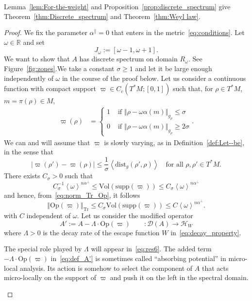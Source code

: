\documentclass[AHL,Unicode,longabstracts,published]{cedram}
\newcommand{\clH}{\mathcal{H}}
\newcommand{\clD}{\mathcal{D}}
\newcommand{\dist}{\mathrm{dist}}
\newcommand{\Voll}{\mathrm{Vol}}
\newcommand{\supp}{\mathrm{supp}}
\newcommand{\Opp}{\mathrm{Op}}
\newcommand{\Tr}{\mathrm{Tr}}
\newcommand{\bbR}{\mathbb{R}}
\newcommand{\clH}{\mathcal{H}}
\newcommand{\bbR}{\mathbb{R}}
\begin{document}
Lemma~\ref{lem:For-the-weight} and Proposition~\ref{prop:discrete_spectrum} give Theorem~\ref{thm:Discrete_spectrum} and Theorem~\ref{thm:Weyl law}.
\begin{proof}
We fix the parameter $\alpha^{\parallel}=0$ that enters in the metric~\eqref{eq:conditions}. Let $\omega\in\bbR$ and set
\begin{equation}\label{eq:def_J_omega}
J_{\omega}:=\left[\omega-1,\omega+1\right].
\end{equation}
We want to show that $A$ has discrete spectrum on domain $R_{\omega}$. See Figure~\ref{fig:zones}.\linebreak We take a constant $\sigma\geq1$ and let it be large enough independently of $\omega$ in the course of the proof below. Let us consider a continuous function with compact support $\varpi\in C_{c}(T^{*}M;[0,1])$ such that, for $\rho\in T^{*}M$, $m=\pi(\rho)\in M$,
\begin{align}\label{eq:def_Omega_0'}
\varpi\left(\rho\right) & =
\begin{cases}
1 & \text{ if }\left\Vert \rho-\omega\alpha\left(m\right)\right\Vert _{g_{\rho}}\leq\sigma\\
0 & \text{ if }\left\Vert \rho-\omega\alpha\left(m\right)\right\Vert _{g_{\rho}}\geq2\sigma
\end{cases}.
\end{align}
We can and will assume that $\varpi$ is slowly varying, as in Definition~\ref{def:Let--be}, in the sense that
\begin{equation}\label{eq:slow_variation_varpi}
\left|\varpi\left(\rho'\right)-\varpi\left(\rho\right)\right|\leq\frac{1}{\sigma}\left\langle \dist_{g}\left(\rho',\rho\right)\right\rangle \quad\text{for all }\rho,\rho'\in T^{*}M.
\end{equation}
There exists $C_{\sigma}>0$ such that
\[
C_{\sigma}^{-1}\left\langle \omega\right\rangle ^{n\alpha^{\perp}}\le\Voll\left(\supp\left(\varpi\right)\right)\le C_{\sigma}\left\langle \omega\right\rangle ^{n\alpha^{\perp}}
\]
and hence, from~\eqref{eq:norm_Tr_Op}, it follows
\begin{equation}\label{eq:trace_Omega_0}
\left\Vert \Opp \left(\varpi\right)\right\Vert _{\Tr}\leq C_{\sigma}\Voll\left(\supp\left(\varpi\right)\right)\leq C\left\langle \omega\right\rangle ^{n\alpha^{\perp}}.
\end{equation}
with $C$ independent of $\omega$. Let us consider the modified operator
\begin{equation}\label{eq:def_A'}
A':=A-\Lambda\cdot\Opp \left(\varpi\right)\qquad:\clD\left(A\right)\rightarrow\clH _{W}
\end{equation}
where $\Lambda>0$ is the decay rate of the escape function $W$ in~\eqref{eq:decay_property}.
\begin{rem}
The special role played by $\Lambda$ will appear in~\eqref{eq:res6}. The added term $-\Lambda\cdot\Opp (\varpi)$ in~\eqref{eq:def_A'} is sometimes called ``absorbing potential'' in micro-local analysis. Its action is somehow to select the component of $A$ that acts micro-locally on the support of $\varpi$ and push it on the left in the spectral domain.
\end{rem}


\end{proof}
\end{document}
